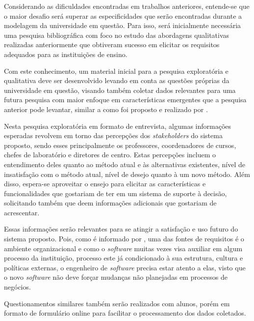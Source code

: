 Considerando as dificuldades encontradas em trabalhos anteriores, entende-se que o maior desafio será superar as especificidades que serão encontradas durante a modelagem da universidade em questão. Para isso, será inicialmente necessária uma pesquisa bibliográfica com foco no estudo das abordagens qualitativas realizadas anteriormente que obtiveram sucesso em elicitar os requisitos adequados para as instituições de ensino.


Com este conhecimento, um material inicial para a pesquisa exploratória e qualitativa deve ser desenvolvido levando em conta as questões próprias da universidade em questão, visando também coletar dados relevantes para uma futura pesquisa com maior enfoque em características emergentes que a pesquisa anterior pode levantar, similar a como foi proposto e realizado por .

Nesta pesquisa exploratória em formato de entrevista, algumas informações esperadas revolvem em torno das percepções dos \textit{stakeholders} do sistema proposto, sendo esses principalmente os professores, coordenadores de cursos, chefes de laboratório e diretores de centro. Estas percepções incluem o entendimento deles quanto ao método atual e às alternativas existentes, nível de insatisfação com o método atual, nível de desejo quanto à um novo método. Além disso, espera-se aproveitar o ensejo para elicitar as características e funcionalidades que gostariam de ter em um sistema de suporte à decisão, solicitando também que deem informações adicionais que gostariam de acrescentar.

Essas informações serão relevantes para se atingir a satisfação e uso futuro do sistema proposto. Pois, como é informado por , uma das fontes de requisitos é o ambiente organizacional e como o \textit{software} muitas vezes visa auxiliar em algum processo da instituição, processo este já condicionado à sua estrutura, cultura e políticas externas, o engenheiro de \textit{software} precisa estar atento a elas, visto que o novo \textit{software} não deve forçar mudanças não planejadas em processos de negócios.

Questionamentos similares também serão realizados com alunos, porém em formato de formulário online para facilitar o processamento dos dados coletados.

\def\LinkParadigm{https://www.visual-paradigm.com/}
\def\LinkDrawio{https://www.drawio.com/}
\def\LinkMermaid{https://mermaid.js.org/}

